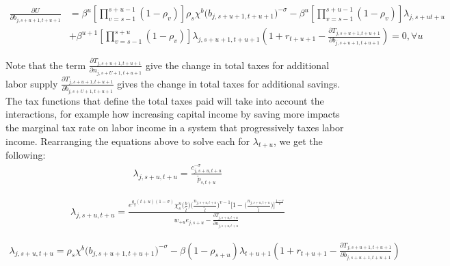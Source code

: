     \begin{equation}\label{Eqbfoc}
      \begin{split}
      \frac{\partial U}{\partial b_{j,s+u+1,t+u+1}} & = \beta^u\left[\prod_{v=s-1}^{s+u-1}(1-\rho_v)\right] \rho_s\chi^b\bigl(b_{j,s+u+1,t+u+1}\bigr)^{-\sigma} - \beta^u\left[\prod_{v=s-1}^{s+u-1}(1-\rho_v)\right] \lambda_{j,s+ut+u}  \\\ 
      & + \beta^{u+1}\left[\prod_{v=s-1}^{s+u}(1-\rho_v)\right] \lambda_{j,s+u+1,t+u+1} \left( 1 + r_{t+u+1} - \frac{\partial T_{j,s+u+1,t+u+1}}{\partial b_{j,s+u+1,t+u+1}} \right)= 0, \forall u
      \end{split}
    \end{equation}

 Note that the term $\frac{\partial T_{j,s+u+1,t+u+1}}{\partial n_{j,s+U+1,t+u+1}}$ give the change in total taxes for additional labor supply $\frac{\partial T_{j,s+u+1,t+u+1}}{\partial b_{j,s+U+1,t+u+1}}$ gives the change in total taxes for additional savings.  The tax functions that define the total taxes paid will take into account the interactions, for example how increasing capital income by saving more impacts the marginal tax rate on labor income in a system that progressively taxes labor income.  Rearranging the equations above to solve each for $\lambda_{t+u}$, we get the following:
    \begin{equation}
      \begin{split}
      \lambda_{j,s+u,t+u} = \frac{c_{j,s+u,t+u}^{-\sigma}}{\tilde{p}_{s,t+u}} \nonumber
      \end{split}
    \end{equation}

    \begin{equation}
      \begin{split}
      \lambda_{j,s+u,t+u} = \frac{e^{g_y (t+u)(1-\sigma)}\chi^n_{s}\biggl(\frac{b}{\tilde{l}}\biggr)\biggl(\frac{n_{j,s+u,t+u}}{\tilde{l}}\biggr)^{v-1}\Biggl[1 - \biggl(\frac{n_{j,s+u,t+u}}{\tilde{l}}\biggr)\Biggr]^{\frac{1-v}{v}}}{ w_{+u} e_{j,s+u} - \frac{\partial T_{j,s+u,t+u}}{\partial n_{j,s+u,t+u}} }  \nonumber
      \end{split}
    \end{equation}

    \begin{equation}
      \begin{split}
      \lambda_{j,s+u,t+u} = \rho_s\chi^b\bigl(b_{j,s+u+1,t+u+1}\bigr)^{-\sigma} - \beta (1-\rho_{s+u}) \lambda_{t+u+1} \left( 1 + r_{t+u+1} - \frac{\partial T_{j,s+u+1,t+u+1}}{\partial b_{j,s+u+1,t+u+1}} \right)
        \end{split}  \nonumber
    \end{equation}

